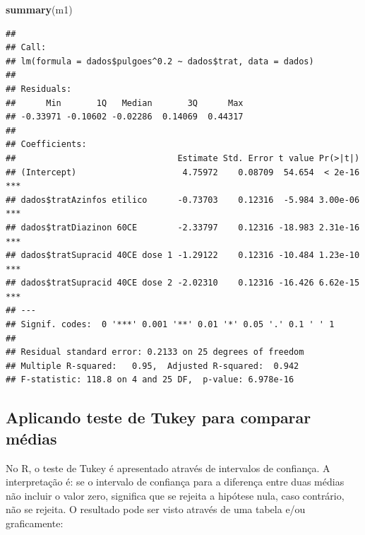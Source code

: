 \documentclass[
]{book}
\newenvironment{Shaded}{\begin{snugshade}}{\end{snugshade}}
\newcommand{\DataTypeTok}[1]{\textcolor[rgb]{0.13,0.29,0.53}{#1}}
\newcommand{\FloatTok}[1]{\textcolor[rgb]{0.00,0.00,0.81}{#1}}
\newcommand{\KeywordTok}[1]{\textcolor[rgb]{0.13,0.29,0.53}{\textbf{#1}}}
\newcommand{\NormalTok}[1]{#1}
\newcommand{\OperatorTok}[1]{\textcolor[rgb]{0.81,0.36,0.00}{\textbf{#1}}}
\newcommand{\StringTok}[1]{\textcolor[rgb]{0.31,0.60,0.02}{#1}}
\begin{document}
\begin{Shaded}
\end{Shaded}

\begin{Shaded}
\begin{Highlighting}[]
\KeywordTok{summary}\NormalTok{(m1)}
\end{Highlighting}
\end{Shaded}

\begin{verbatim}
## 
## Call:
## lm(formula = dados$pulgoes^0.2 ~ dados$trat, data = dados)
## 
## Residuals:
##      Min       1Q   Median       3Q      Max 
## -0.33971 -0.10602 -0.02286  0.14069  0.44317 
## 
## Coefficients:
##                                Estimate Std. Error t value Pr(>|t|)    
## (Intercept)                     4.75972    0.08709  54.654  < 2e-16 ***
## dados$tratAzinfos etilico      -0.73703    0.12316  -5.984 3.00e-06 ***
## dados$tratDiazinon 60CE        -2.33797    0.12316 -18.983 2.31e-16 ***
## dados$tratSupracid 40CE dose 1 -1.29122    0.12316 -10.484 1.23e-10 ***
## dados$tratSupracid 40CE dose 2 -2.02310    0.12316 -16.426 6.62e-15 ***
## ---
## Signif. codes:  0 '***' 0.001 '**' 0.01 '*' 0.05 '.' 0.1 ' ' 1
## 
## Residual standard error: 0.2133 on 25 degrees of freedom
## Multiple R-squared:   0.95,  Adjusted R-squared:  0.942 
## F-statistic: 118.8 on 4 and 25 DF,  p-value: 6.978e-16
\end{verbatim}

\hypertarget{aplicando-teste-de-tukey-para-comparar-muxe9dias}{%
\subsection{Aplicando teste de Tukey para comparar médias}\label{aplicando-teste-de-tukey-para-comparar-muxe9dias}}

No R, o teste de Tukey é apresentado através de intervalos de confiança. A interpretação é: se o intervalo de confiança para a diferença entre duas médias não incluir o valor zero, significa que se rejeita a hipótese nula, caso contrário, não se rejeita. O resultado pode ser visto através de uma tabela e/ou graficamente:
\end{document}

